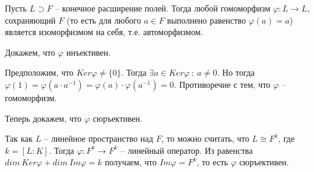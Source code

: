 Пусть $L \supset F$ -- конечное расширение полей. Тогда любой гомоморфизм
$\varphi: L \to L$, сохраняющий $F$ (то есть для любого $a \in F$ выполнено
равенство $\varphi(a) = a$) является изоморфизмом на себя, т.е. автоморфизмом.

Докажем, что $\varphi$ инъективен.

Предположим, что $Ker \varphi \neq \{0\}$. 
Тогда $\exists a \in Ker \varphi\ :\ a \neq 0$.
Но тогда $\varphi(1) = \varphi(a \cdot a^{-1}) = 
\varphi(a) \cdot \varphi(a^{-1}) = 0$. Противоречие с тем, что
$\varphi$ -- гомоморфизм.

Теперь докажем, что $\varphi$ сюръективен.

Так как $L$ -- линейное пространство над $F$, то можно считать, что
$L \cong F^k$, где $k = [L : K]$. 
Тогда $\varphi: F^k \to F^k$ -- линейный оператор.
Из равенства
$dim\ Ker \varphi + dim\ Im \varphi = k$ получаем, что
$Im \varphi = F^k$, то есть $\varphi$ сюръективен.
